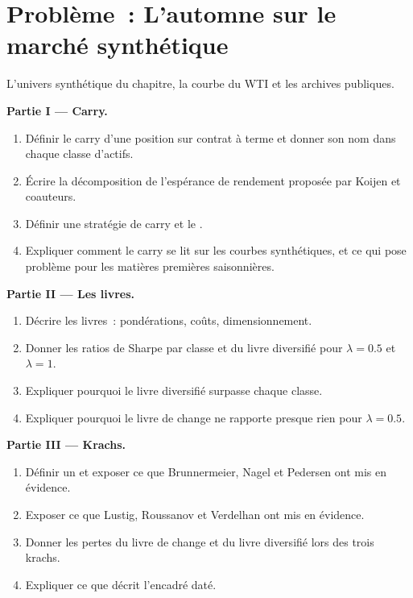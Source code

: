 \section{Problème~: L'automne sur le marché synthétique}

\begin{problem}\label{pb:s1:carry-across-asset-classes:1}
L'univers synthétique du chapitre, la courbe du WTI et les archives publiques.

\medskip\noindent\textbf{Partie I --- Carry.}
\begin{enumerate}
\item Définir le carry d'une position sur contrat à terme et donner son nom dans chaque classe d'actifs.
\item Écrire la décomposition de l'espérance de rendement proposée par Koijen et coauteurs.
\item Définir une stratégie de carry et le .
\item Expliquer comment le carry se lit sur les courbes synthétiques, et ce qui pose problème pour les matières premières saisonnières.
\end{enumerate}

\medskip\noindent\textbf{Partie II --- Les livres.}
\begin{enumerate}[resume]
\item Décrire les livres~: pondérations, coûts, dimensionnement.
\item Donner les ratios de Sharpe par classe et du livre diversifié pour $\lambda = 0.5$ et $\lambda = 1$.
\item Expliquer pourquoi le livre diversifié surpasse chaque classe.
\item Expliquer pourquoi le livre de change ne rapporte presque rien pour $\lambda = 0.5$.
\end{enumerate}

\medskip\noindent\textbf{Partie III --- Krachs.}
\begin{enumerate}[resume]
\item Définir un  et exposer ce que Brunnermeier, Nagel et Pedersen ont mis en évidence.
\item Exposer ce que Lustig, Roussanov et Verdelhan ont mis en évidence.
\item Donner les pertes du livre de change et du livre diversifié lors des trois krachs.
\item Expliquer ce que décrit l'encadré daté.
\end{enumerate}


\end{problem}
